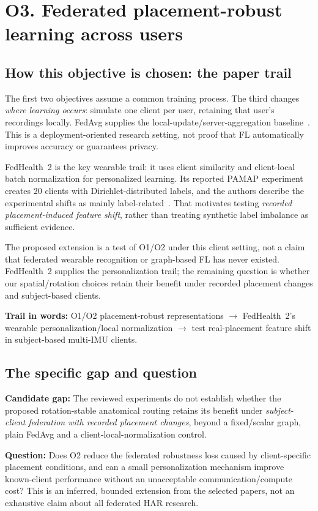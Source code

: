 \documentclass[10pt]{article}
\begin{document}
\clearpage
\section*{O3. Federated placement-robust learning across users}
\subsection*{How this objective is chosen: the paper trail}
The first two objectives assume a common training process. The third changes \emph{where learning occurs}: simulate one client per user, retaining that user's recordings locally. FedAvg supplies the local-update/server-aggregation baseline~\cite{omfedavg}. This is a deployment-oriented research setting, not proof that FL automatically improves accuracy or guarantees privacy.

FedHealth~2 is the key wearable trail: it uses client similarity and client-local batch normalization for personalized learning. Its reported PAMAP experiment creates 20 clients with Dirichlet-distributed labels, and the authors describe the experimental shifts as mainly label-related~\cite{omfedhealth}. That motivates testing \emph{recorded placement-induced feature shift}, rather than treating synthetic label imbalance as sufficient evidence.

The proposed extension is a test of O1/O2 under this client setting, not a claim that federated wearable recognition or graph-based FL has never existed. FedHealth~2 supplies the personalization trail; the remaining question is whether our spatial/rotation choices retain their benefit under recorded placement changes and subject-based clients.

\textbf{Trail in words:} O1/O2 placement-robust representations $\rightarrow$ FedHealth~2's wearable personalization/local normalization $\rightarrow$ test real-placement feature shift in subject-based multi-IMU clients.

\subsection*{The specific gap and question}
\textbf{Candidate gap:} The reviewed experiments do not establish whether the proposed rotation-stable anatomical routing retains its benefit under \emph{subject-client federation with recorded placement changes}, beyond a fixed/scalar graph, plain FedAvg and a client-local-normalization control.

\textbf{Question:} Does O2 reduce the federated robustness loss caused by client-specific placement conditions, and can a small personalization mechanism improve known-client performance without an unacceptable communication/compute cost? This is an inferred, bounded extension from the selected papers, not an exhaustive claim about all federated HAR research.
\end{document}

